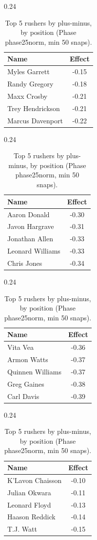 \begin{table}[h!]
\centering
\begin{subtable}{0.24\textwidth}
\centering
\footnotesize
\begin{tabular}{lc}
\toprule
Name & Effect \\
\midrule
Myles Garrett & -0.15 \\
Randy Gregory & -0.18 \\
Maxx Crosby & -0.21 \\
Trey Hendrickson & -0.21 \\
Marcus Davenport & -0.22 \\
\bottomrule
\end{tabular}
\caption{DE}
\end{subtable}
\hfill
\begin{subtable}{0.24\textwidth}
\centering
\footnotesize
\begin{tabular}{lc}
\toprule
Name & Effect \\
\midrule
Aaron Donald & -0.30 \\
Javon Hargrave & -0.31 \\
Jonathan Allen & -0.33 \\
Leonard Williams & -0.33 \\
Chris Jones & -0.34 \\
\bottomrule
\end{tabular}
\caption{DT}
\end{subtable}
\hfill
\begin{subtable}{0.24\textwidth}
\centering
\footnotesize
\begin{tabular}{lc}
\toprule
Name & Effect \\
\midrule
Vita Vea & -0.36 \\
Armon Watts & -0.37 \\
Quinnen Williams & -0.37 \\
Greg Gaines & -0.38 \\
Carl Davis & -0.39 \\
\bottomrule
\end{tabular}
\caption{NT}
\end{subtable}
\hfill
\begin{subtable}{0.24\textwidth}
\centering
\footnotesize
\begin{tabular}{lc}
\toprule
Name & Effect \\
\midrule
K'Lavon Chaisson & -0.10 \\
Julian Okwara & -0.11 \\
Leonard Floyd & -0.13 \\
Haason Reddick & -0.14 \\
T.J. Watt & -0.15 \\
\bottomrule
\end{tabular}
\caption{OLB}
\end{subtable}
\caption{Top 5 rushers by plus-minus, by position (Phase phase25norm, min 50 snaps).}
\label{tab:rusher_pm_phase25norm_top}
\end{table}

